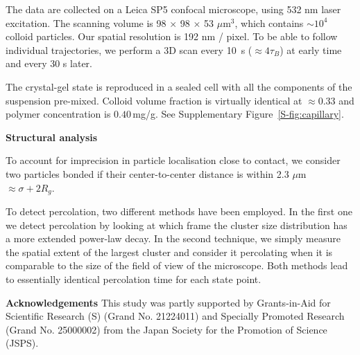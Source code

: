 \documentclass[preprint,amsmath,amssymb,superscriptaddress]{revtex4-1}
\begin{document}
The data are collected on a Leica SP5 confocal microscope, using 532 nm laser excitation. The scanning volume is 98 $\times$ 98 $\times$ 53 $\mu$m$^3$, which contains $\sim 10^4$ colloid particles. Our spatial resolution is 192 nm / pixel. To be able to follow individual trajectories, we perform a 3D scan every 10~s ($\approx 4\tau_B$) at early time and every 30 s later.

The crystal-gel state is reproduced in a sealed cell with all the components of the suspension pre-mixed. Colloid volume fraction is virtually identical at $\approx 0.33$ and polymer concentration is $0.40\,$mg/g. See Supplementary Figure~\ref{S-fig:capillary}.





%

\noindent
{\bf Structural analysis}

To account for imprecision in particle localisation close to contact, we consider two particles bonded if their center-to-center distance is within 2.3 $\mu$m $\approx\sigma+2R_g$.

To detect percolation, two different methods have been employed. In the first one we detect percolation
by looking at which frame the cluster size distribution has a more extended power-law decay. In the second technique,
we simply measure the spatial extent of the largest cluster and consider it percolating when it is comparable to the
size of the field of view of the microscope. Both methods lead to essentially identical percolation time for each state point.






\vspace{1cm}
\noindent
{\bf Acknowledgements} 
This study was partly supported by Grants-in-Aid for Scientific Research (S) (Grand No. 21224011) and Specially Promoted Research (Grand No. 25000002) from the Japan Society for the Promotion of Science (JSPS). 
\end{document}
